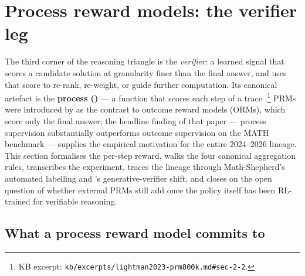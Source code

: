 
\section{Process reward models: the verifier leg}
\label{sec:process-reward-models}

The third corner of the reasoning triangle is the \emph{verifier}: a
learned signal that scores a candidate solution at granularity finer
than the final answer, and uses that score to re-rank, re-weight, or
guide further computation. Its canonical artefact is the
\textbf{process  ()} — a function that scores each step
of a  trace
\citep[\S 2.2]{lightman2023-prm800k}.\footnote{KB excerpt:
\nolinkurl{kb/excerpts/lightman2023-prm800k.md#sec-2-2}.} PRMs were
introduced by \citet{lightman2023-prm800k} as the contrast to outcome
reward models (ORMs), which score only the final answer; the headline
finding of that paper — process supervision substantially outperforms
outcome supervision on the MATH benchmark — supplies the empirical
motivation for the entire 2024--2026  lineage. This section
formalises the per-step reward, walks the four canonical aggregation
rules, transcribes the  experiment, traces the lineage through
Math-Shepherd's automated labelling and 's generative-verifier
shift, and closes on the open question of whether external PRMs still
add  once the policy itself has been RL-trained for verifiable
reasoning.

\subsection{What a process reward model commits to}
\label{sec:prm-commitment}


